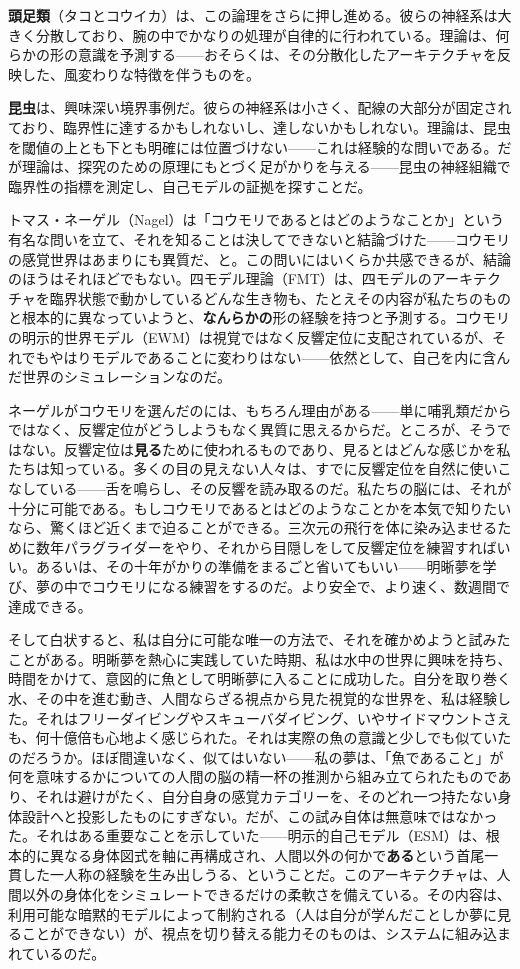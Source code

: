 \documentclass[11pt, twoside, openright]{book}
\begin{document}
\textbf{頭足類}（タコとコウイカ）は、この論理をさらに押し進める。彼らの神経系は大きく分散しており、腕の中でかなりの処理が自律的に行われている。理論は、何らかの形の意識を予測する------おそらくは、その分散化したアーキテクチャを反映した、風変わりな特徴を伴うものを。

\textbf{昆虫}は、興味深い境界事例だ。彼らの神経系は小さく、配線の大部分が固定されており、臨界性に達するかもしれないし、達しないかもしれない。理論は、昆虫を閾値の上とも下とも明確には位置づけない------これは経験的な問いである。だが理論は、探究のための原理にもとづく足がかりを与える------昆虫の神経組織で臨界性の指標を測定し、自己モデルの証拠を探すことだ。

トマス・ネーゲル（Nagel）は「コウモリであるとはどのようなことか」という有名な問いを立て、それを知ることは決してできないと結論づけた------コウモリの感覚世界はあまりにも異質だ、と。この問いにはいくらか共感できるが、結論のほうはそれほどでもない。四モデル理論（FMT）は、四モデルのアーキテクチャを臨界状態で動かしているどんな生き物も、たとえその内容が私たちのものと根本的に異なっていようと、\textbf{なんらかの}形の経験を持つと予測する。コウモリの明示的世界モデル（EWM）は視覚ではなく反響定位に支配されているが、それでもやはりモデルであることに変わりはない------依然として、自己を内に含んだ世界のシミュレーションなのだ。

ネーゲルがコウモリを選んだのには、もちろん理由がある------単に哺乳類だからではなく、反響定位がどうしようもなく異質に思えるからだ。ところが、そうではない。反響定位は\textbf{見る}ために使われるものであり、見るとはどんな感じかを私たちは知っている。多くの目の見えない人々は、すでに反響定位を自然に使いこなしている------舌を鳴らし、その反響を読み取るのだ。私たちの脳には、それが十分に可能である。もしコウモリであるとはどのようなことかを本気で知りたいなら、驚くほど近くまで迫ることができる。三次元の飛行を体に染み込ませるために数年パラグライダーをやり、それから目隠しをして反響定位を練習すればいい。あるいは、その十年がかりの準備をまるごと省いてもいい------明晰夢を学び、夢の中でコウモリになる練習をするのだ。より安全で、より速く、数週間で達成できる。

そして白状すると、私は自分に可能な唯一の方法で、それを確かめようと試みたことがある。明晰夢を熱心に実践していた時期、私は水中の世界に興味を持ち、時間をかけて、意図的に魚として明晰夢に入ることに成功した。自分を取り巻く水、その中を進む動き、人間ならざる視点から見た視覚的な世界を、私は経験した。それはフリーダイビングやスキューバダイビング、いやサイドマウントさえも、何十億倍も心地よく感じられた。それは実際の魚の意識と少しでも似ていたのだろうか。ほぼ間違いなく、似てはいない------私の夢は、「魚であること」が何を意味するかについての人間の脳の精一杯の推測から組み立てられたものであり、それは避けがたく、自分自身の感覚カテゴリーを、そのどれ一つ持たない身体設計へと投影したものにすぎない。だが、この試み自体は無意味ではなかった。それはある重要なことを示していた------明示的自己モデル（ESM）は、根本的に異なる身体図式を軸に再構成され、人間以外の何かで\textbf{ある}という首尾一貫した一人称の経験を生み出しうる、ということだ。このアーキテクチャは、人間以外の身体化をシミュレートできるだけの柔軟さを備えている。その内容は、利用可能な暗黙的モデルによって制約される（人は自分が学んだことしか夢に見ることができない）が、視点を切り替える能力そのものは、システムに組み込まれているのだ。
\end{document}
